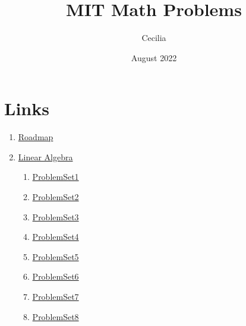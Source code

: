 \documentclass{article}
\title{MIT Math Problems}
\author{Cecilia}
\date{August 2022}
\begin{document}
\maketitle

\section*{Links}
    \begin{enumerate}
        \item \href{https://math.mit.edu/academics/undergrad/roadmaps.php}{Roadmap}
        \item \href{https://ocw.mit.edu/courses/18-700-linear-algebra-fall-2013/}{Linear Algebra}
        \begin{enumerate}
            \item \hyperlink{LinearAlgebra-ProblemSet1.1}{ProblemSet1}
            \item \hyperlink{LinearAlgebra-ProblemSet2.1}{ProblemSet2}
            \item \hyperlink{LinearAlgebra-ProblemSet3.1}{ProblemSet3}
            \item \hyperlink{LinearAlgebra-ProblemSet4.1}{ProblemSet4}
            \item \hyperlink{LinearAlgebra-ProblemSet5.1}{ProblemSet5}
            \item \hyperlink{LinearAlgebra-ProblemSet6.1}{ProblemSet6}
            \item \hyperlink{LinearAlgebra-ProblemSet7.1}{ProblemSet7}
            \item \hyperlink{LinearAlgebra-ProblemSet8.1}{ProblemSet8}
        \end{enumerate}
    \end{enumerate}

%
%

















\end{document}
